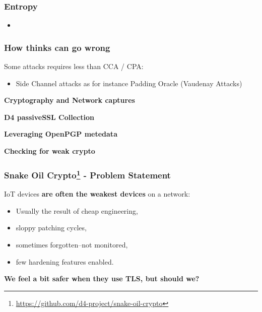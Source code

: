 \documentclass{beamer}
\begin{document}
\begin{frame}
        \frametitle{Entropy}

        \begin{itemize}
          \item
        \end{itemize}

\end{frame}

\begin{frame}
        \frametitle{How thinks can go wrong}
        Some attacks requires less than CCA / CPA:
        \begin{itemize}
          \item Side Channel attacks as for instance Padding Oracle (Vaudenay Attacks)
        \end{itemize}

\end{frame}




\begin{frame}
  \begin{center}
    {\bf Cryptography and Network captures}
  \end{center}
\end{frame}

\begin{frame}
  \begin{center}
    {\bf D4 passiveSSL Collection}
  \end{center}
\end{frame}

\begin{frame}
  \begin{center}
    {\bf Leveraging OpenPGP metedata}
  \end{center}
\end{frame}

\begin{frame}
  \begin{center}
    {\bf Checking for weak crypto}
  \end{center}
\end{frame}

\begin{frame}
  \frametitle{Snake Oil Crypto\footnote{\url{https://github.com/d4-project/snake-oil-crypto}} - Problem Statement}
  IoT devices {\bf are often the weakest devices} on a network:
        \begin{itemize}
        \item Usually the result of cheap engineering,
        \item sloppy patching cycles,
        \item sometimes forgotten--not monitored,
        \item few hardening features enabled.
        \end{itemize}

        \vspace{10 mm} 

{\bf We feel a bit safer when they use TLS, but should we?}

\end{frame}
\end{document}
